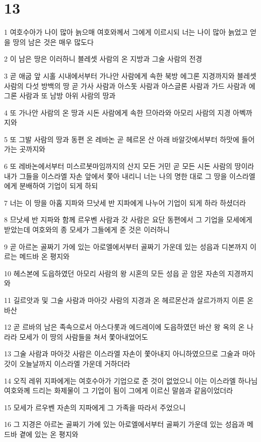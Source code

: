 \chapter{13}

\par 1 여호수아가 나이 많아 늙으매 여호와께서 그에게 이르시되 너는 나이 많아 늙었고 얻을 땅의 남은 것은 매우 많도다
\par 2 이 남은 땅은 이러하니 블레셋 사람의 온 지방과 그술 사람의 전경
\par 3 곧 애굽 앞 시홀 시내에서부터 가나안 사람에게 속한 북방 에그론 지경까지와 블레셋 사람의 다섯 방백의 땅 곧 가사 사람과 아스돗 사람과 아스글론 사람과 가드 사람과 에그론 사람과 또 남방 아위 사람의 땅과
\par 4 또 가나안 사람의 온 땅과 시돈 사람에게 속한 므아라와 아모리 사람의 지경 아벡까지와
\par 5 또 그발 사람의 땅과 동편 온 레바논 곧 헤르몬 산 아래 바알갓에서부터 하맛에 들어가는 곳까지와
\par 6 또 레바논에서부터 미스르봇마임까지의 산지 모든 거민 곧 모든 시돈 사람의 땅이라 내가 그들을 이스라엘 자손 앞에서 쫓아 내리니 너는 나의 명한 대로 그 땅을 이스라엘에게 분배하여 기업이 되게 하되
\par 7 너는 이 땅을 아홉 지파와 므낫세 반 지파에게 나누어 기업이 되게 하라 하셨더라
\par 8 므낫세 반 지파와 함께 르우벤 사람과 갓 사람은 요단 동편에서 그 기업을 모세에게 받았는데 여호와의 종 모세가 그들에게 준 것은 이러하니
\par 9 곧 아르논 골짜기 가에 있는 아로엘에서부터 골짜기 가운데 있는 성읍과 디본까지 이르는 메드바 온 평지와
\par 10 헤스본에 도읍하였던 아모리 사람의 왕 시혼의 모든 성읍 곧 암몬 자손의 지경까지와
\par 11 길르앗과 및 그술 사람과 마아갓 사람의 지경과 온 헤르몬산과 살르가까지 이른 온 바산
\par 12 곧 르바의 남은 족속으로서 아스다롯과 에드레이에 도읍하였던 바산 왕 옥의 온 나라라 모세가 이 땅의 사람들을 쳐서 쫓아내었어도
\par 13 그술 사람과 마아갓 사람은 이스라엘 자손이 쫓아내지 아니하였으므로 그술과 마아갓이 오늘날까지 이스라엘 가운데 거하더라
\par 14 오직 레위 지파에게는 여호수아가 기업으로 준 것이 없었으니 이는 이스라엘 하나님 여호와께 드리는 화제물이 그 기업이 됨이 그에게 이르신 말씀과 같음이었더라
\par 15 모세가 르우벤 자손의 지파에게 그 가족을 따라서 주었으니
\par 16 그 지경은 아르논 골짜기 가에 있는 아로엘에서부터 골짜기 가운데 있는 성읍과 메드바 곁에 있는 온 평지와
